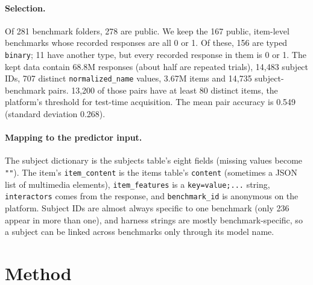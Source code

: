 \documentclass{article}
\begin{document}
\paragraph{Selection.} Of 281 benchmark folders, 278 are public. We keep the 167 public, item-level
benchmarks whose recorded responses are all 0 or 1. Of these, 156 are typed \texttt{binary}; 11 have
another type, but every recorded response in them is 0 or 1. The kept data contain 68.8M responses
(about half are repeated trials), 14,483 subject IDs, 707 distinct
\texttt{normalized\_name} values, 3.67M items and 14,735 subject-benchmark pairs. 13,200 of those
pairs have at least 80 distinct items, the platform's threshold for test-time acquisition. The mean pair
accuracy is 0.549 (standard deviation 0.268).

\paragraph{Mapping to the predictor input.} The subject dictionary is the subjects table's eight
fields (missing values become \texttt{""}). The item's \texttt{item\_content} is the items table's
\texttt{content} (sometimes a JSON list of multimedia elements), \texttt{item\_features} is a
\texttt{key=value;...} string, \texttt{interactors} comes from the response, and \texttt{benchmark\_id}
is anonymous on the platform. Subject IDs are almost always specific to one benchmark (only 236
appear in more than one), and harness strings are mostly benchmark-specific, so a subject can be
linked across benchmarks only through its model name.

\section{Method}
\end{document}
